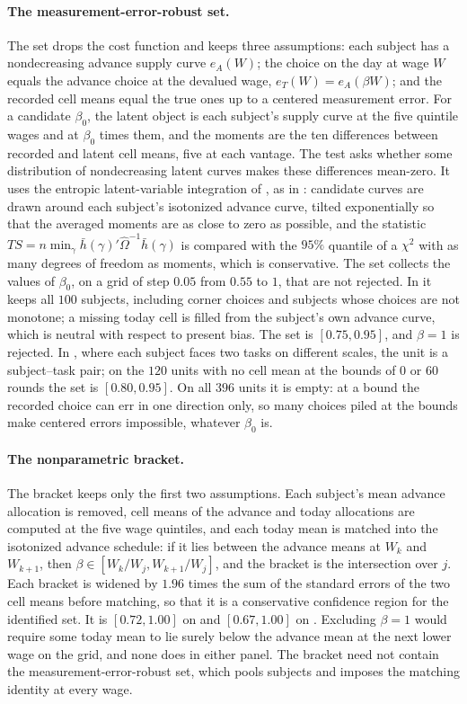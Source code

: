 \documentclass[11pt,a4paper]{article}
\theoremstyle{plain}
\theoremstyle{definition}
\begin{document}
\paragraph{The measurement-error-robust set.} The set drops the cost function and keeps three assumptions: each subject
has a nondecreasing advance supply curve $e_A(W)$; the choice on the day at wage $W$ equals the advance choice at the
devalued wage, $e_T(W)=e_A(\beta W)$; and the recorded cell means equal the true ones up to a centered measurement
error. For a candidate $\beta_0$, the latent object is each subject's supply curve at the five quintile wages and at
$\beta_0$ times them, and the moments are the ten differences between recorded and latent cell means, five at each
vantage. The test asks whether some distribution of nondecreasing latent curves makes these differences mean-zero.
It uses the entropic latent-variable integration of \citet{schennach2014}, as in \citet{aguiar2021}: candidate curves
are drawn around each subject's isotonized advance curve, tilted exponentially so that the averaged moments are as
close to zero as possible, and the statistic $\mathit{TS}=n\min_\gamma\bar h(\gamma)'\hat\Omega^{-1}\bar h(\gamma)$ is
compared with the $95\%$ quantile of a $\chi^2$ with as many degrees of freedom as moments, which is conservative. The
set collects the values of $\beta_0$, on a grid of step $0.05$ from $0.55$ to $1$, that are not rejected. In
\citet{augenblick2019} it keeps all $100$ subjects, including corner choices and subjects whose choices are not
monotone; a missing today cell is filled from the subject's own advance curve, which is neutral with respect to
present bias. The set is $[0.75,0.95]$, and $\beta=1$ is rejected. In \citet{fedyk2024}, where each subject faces two
tasks on different scales, the unit is a subject--task pair; on the $120$ units with no cell mean at the bounds of $0$
or $60$ rounds the set is $[0.80,0.95]$. On all $396$ units it is empty: at a bound the recorded choice can err in one
direction only, so many choices piled at the bounds make centered errors impossible, whatever $\beta_0$ is.

\paragraph{The nonparametric bracket.} The bracket keeps only the first two assumptions. Each subject's mean advance
allocation is removed, cell means of the advance and today allocations are computed at the five wage quintiles, and
each today mean is matched into the isotonized advance schedule: if it lies between the advance means at $W_k$ and
$W_{k+1}$, then $\beta\in[W_k/W_j,W_{k+1}/W_j]$, and the bracket is the intersection over $j$. Each bracket is widened
by $1.96$ times the sum of the standard errors of the two cell means before matching, so that it is a conservative
confidence region for the identified set. It is $[0.72,1.00]$ on \citet{augenblick2019} and $[0.67,1.00]$ on
\citet{fedyk2024}. Excluding $\beta=1$ would require some today mean to lie surely below the advance mean at the next
lower wage on the grid, and none does in either panel. The bracket need not contain the measurement-error-robust
set, which pools subjects and imposes the matching identity at every wage.
\end{document}

